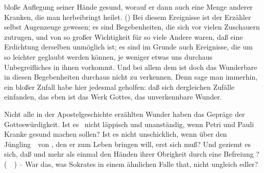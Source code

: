 \begin{aufza}
bloße Auflegung seiner Hände gesund, worauf er dann auch eine Menge anderer Kranken, die man herbeibringt heilet. () Bei diesem Ereignisse ist der Erzähler selbst Augenzeuge gewesen; es sind Begebenheiten, die sich vor vielen Zuschauern zutrugen, und von so großer Wichtigkeit für so viele Andere waren, daß eine Erdichtung derselben unmöglich ist; es sind im Grunde auch Ereignisse, die um so leichter geglaubt werden können, je weniger etwas uns durchaus Unbegreifliches in ihnen vorkommt. Und bei allem dem ist doch das Wunderbare in diesen Begebenheiten durchaus nicht zu verkennen. Denn sage man immerhin, ein bloßer Zufall habe hier jedesmal geholfen: daß sich dergleichen Zufälle  einfanden, das eben ist das Werk Gottes, das unverkennbare Wunder.
\item[\RWbet{Einwurf.}] Nicht alle in der Apostelgeschichte erzählten Wunder haben das Gepräge der Gotteswürdigkeit. Ist es \zB\ nicht läppisch und unanständig, wenn Petri  und Pauli  Kranke gesund machen sollen? Ist es nicht unschicklich, wenn  über den Jüngling~\ von , den er zum Leben bringen will, erst sich  muß? Und geziemt es sich, daß  und  mehr als einmal den Händen ihrer Obrigkeit durch eine  Befreiung ? (\ \ ) -- War das, was Sokrates in einem ähnlichen Falle that, nicht ungleich edler?

\end{aufza}
